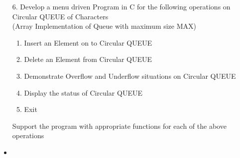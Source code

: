 \documentclass{article}
\newcommand{\answer}{\item [$\rightarrow$]}
\begin{document}
	\begin{itemize}
		\item [6.] Develop a menu driven Program in C for the following operations on Circular QUEUE of Characters \\
		(Array Implementation of Queue with maximum size MAX)
		\begin{enumerate}[label=\alph*.]
			\item Insert an Element on to Circular QUEUE
			\item Delete an Element from Circular QUEUE
			\item Demonstrate Overflow and Underflow situations on Circular QUEUE
			\item Display the status of Circular QUEUE
			\item Exit
		\end{enumerate}
		Support the program with appropriate functions for each of the above operations
		\answer \inputminted{c}{../Program6.c}
	\end{itemize}
\end{document}
